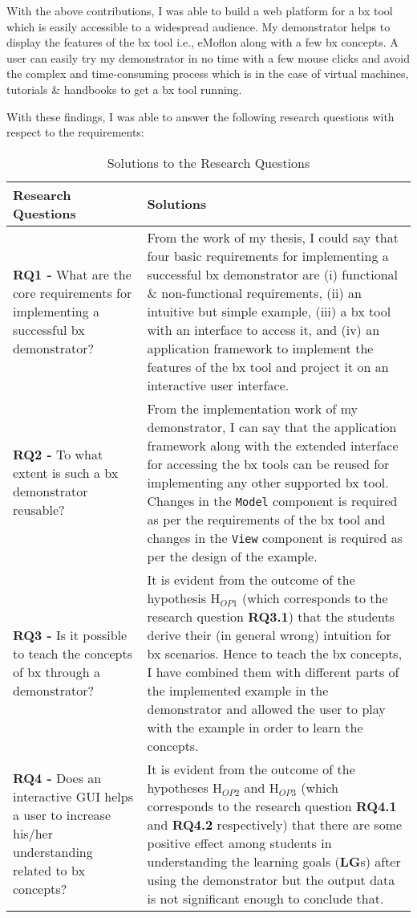 With the above contributions, I was able to build a web platform for a bx tool which is easily accessible to a widespread audience. My demonstrator helps to display the features of the bx tool i.e., eMoflon along with a few bx concepts. A user can easily try my demonstrator in no time with a few mouse clicks and avoid the complex and time-consuming process which is in the case of virtual machines, tutorials \& handbooks to get a bx tool running. 

With these findings, I was able to answer the following research questions with respect to the requirements:
\begin{table}[ht]
	\centering	
	\begin{tabular}{|p{5cm}|p{9.5cm}|}
		\hline
		\rowcolor[gray]{.8}	
		\textbf{Research Questions} & \textbf{Solutions}\\
		\hline
		\textbf{RQ1 -} What are the core requirements for implementing a successful bx demonstrator? &
		From the work of my thesis, I could say that four basic requirements for implementing a successful bx demonstrator are (i) functional \& non-functional requirements, (ii) an intuitive but simple example, (iii) a bx tool with an interface to access it, and (iv) an application framework to implement the features of the bx tool and project it on an interactive user interface.\\
		\hline
		\textbf{RQ2 -} To what extent is such a bx demonstrator reusable? &
		From the implementation work of my demonstrator, I can say that the application framework along with the extended interface for accessing the bx tools can be reused for implementing any other supported bx tool. Changes in the \texttt{Model} component is required as per the requirements of the bx tool and changes in the \texttt{View} component is required as per the design of the example.\\
		\hline
		\textbf{RQ3 -} Is it possible to teach the concepts of bx through a demonstrator? &
		It is evident from the outcome of the hypothesis H$_{OP1}$ (which corresponds to the research question \textbf{RQ3.1}) that the students derive their (in general wrong) intuition for bx scenarios. Hence to teach the bx concepts, I have combined them with different parts of the implemented example in the demonstrator and allowed the user to play with the example in order to learn the concepts.\\
		\hline	
		\textbf{RQ4 -} Does an interactive GUI helps a user to increase his/her understanding related to bx concepts? &
		It is evident from the outcome of the hypotheses H$_{OP2}$ and H$_{OP3}$ (which corresponds to the research question \textbf{RQ4.1} and \textbf{RQ4.2} respectively) that there are some positive effect among students in understanding the learning goals (\textbf{LG}s) after using the demonstrator but the output data is not significant enough to conclude that.\\
		\hline			
	\end{tabular}
	\caption{Solutions to the Research Questions}
	\label{tab:Solutions_ResearchQuestions}
\end{table}

